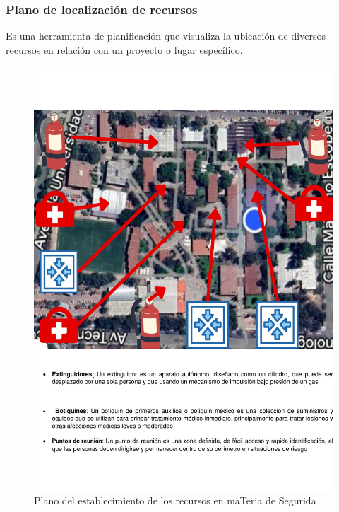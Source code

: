     \subsubsection{Plano de localización de recursos}
    Es una herramienta de planificación que visualiza la ubicación de diversos recursos en relación con un proyecto o lugar específico.\cite{E}
    \begin{figure}[H]
        \centering
        \includegraphics[scale=0.3]{9/Img/planoEstablecimiento.pdf}
        \caption{Plano del establecimiento de los recursos en maTeria de Segurida}
        \label{fig:mapa-itq}
    \end{figure}
